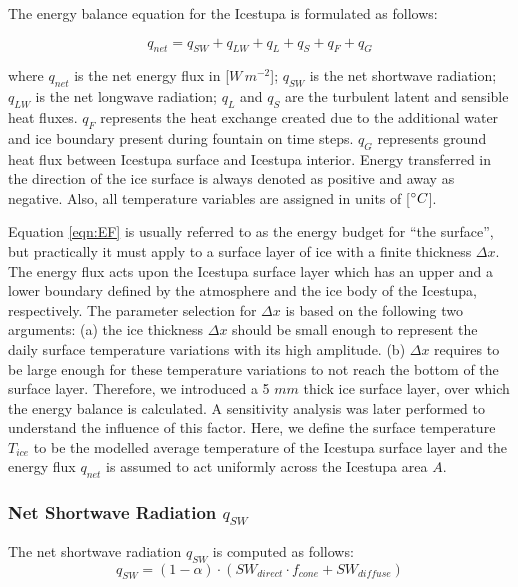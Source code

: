 \documentclass[utf8]{frontiersSCNS} %
\begin{document}
The energy balance equation for the Icestupa is formulated as follows:

\begin{equation}
q_{net} = q_{SW} + q_{LW} + q_{L} + q_{S} + q_{F} + q_{G} \label{eqn:EF} \end{equation}

where $q_{net}$ is the net energy flux in [$W\,m^{-2}$]; $q_{SW}$ is the net shortwave radiation; $q_{LW}$ is the net
longwave radiation; $q_{L}$ and $q_{S}$ are the turbulent latent and sensible heat fluxes. $q_{F}$ represents the heat
exchange created due to the additional water and ice boundary present during fountain on time steps. $q_{G}$ represents
ground heat flux between Icestupa surface and Icestupa interior. Energy transferred in the direction of the ice surface
is always denoted as positive and away as negative. Also, all temperature variables are assigned in units of [$\degree
C$]. 

Equation \ref{eqn:EF} is usually referred to as the energy budget for “the surface”, but practically it must apply to a
surface layer of ice with a finite thickness $\Delta x$. The energy flux acts upon the Icestupa surface layer which has
an upper and a lower boundary defined by the atmosphere and the ice body of the Icestupa, respectively. The parameter
selection for $\Delta x$ is based on the following two arguments: (a) the ice thickness $\Delta x$ should be small
enough to represent the daily surface temperature variations with its high amplitude. (b) $\Delta x$ requires to be
large enough for these temperature variations to not reach the bottom of the surface layer.  Therefore, we introduced a
5 $mm$ thick ice surface layer, over which the energy balance is calculated. A sensitivity analysis was later performed
to understand the influence of this factor. Here, we define the surface temperature $T_{ice}$ to be the modelled average
temperature of the Icestupa surface layer and the energy flux $q_{net}$ is assumed to act uniformly across the Icestupa
area $A$.

\subsubsection{Net Shortwave Radiation $q_{SW}$} The net shortwave radiation $q_{SW}$ is computed as follows:
\begin{equation} q_{SW} = (1- \alpha)\cdot (SW_{direct} \cdot f_{cone} + SW_{diffuse}) \label{eqn:SW} \end{equation}
\end{document}
